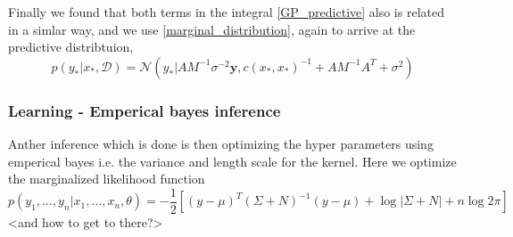 Finally we found that both terms in the integral \eqref{GP_predictive} also is related
in a simlar way, and we use \eqref{marginal_distribution}, again to arrive at the predictive
distribtuion, 
$$p(y_*|x_*,\mathcal{D}) = \mathcal{N}(y_*|AM^{-1}\sigma^{-2}\textbf{y}, c(x_*, x_*)^{-1}+
AM^{-1}A^T+\sigma^2)$$


\subsubsection*{Learning - Emperical bayes inference}

Anther inference which is done is then optimizing the hyper parameters using emperical bayes i.e.
the variance and length scale for the kernel. Here we optimize the marginalized likelihood function
$$p(y_1, \dots, y_n|x_1, \dots, x_n, \theta) = -\frac{1}{2}[(y-\mu)^T (\Sigma+N)^{-1}(y-\mu)+ \log |\Sigma+N|+n \log 2\pi]$$
<and how to get to there?>


